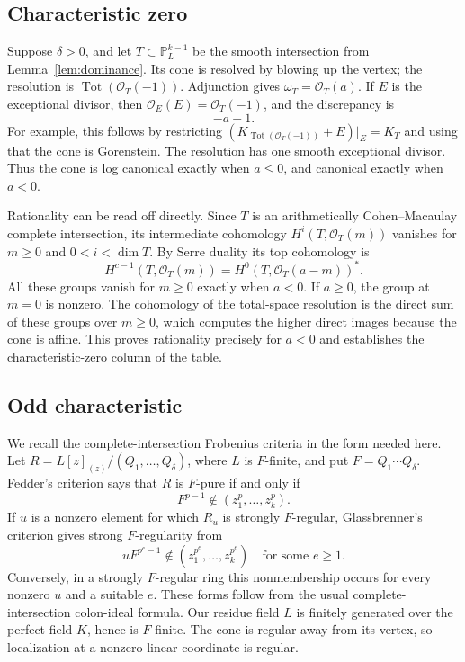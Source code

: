 \documentclass[11pt]{article}
\theoremstyle{definition}
\theoremstyle{remark}
\numberwithin{equation}{section}
\DeclareMathOperator{\Tot}{Tot}
\newcommand{\PP}{\mathbb P}
\newcommand{\OO}{\mathcal O}
\begin{document}
\subsection{Characteristic zero}

Suppose $\delta>0$, and let $T\subset\PP^{k-1}_L$ be the smooth
intersection from Lemma~\ref{lem:dominance}. Its cone is resolved by
blowing up the vertex; the resolution is $\Tot(\OO_T(-1))$.
Adjunction gives $\omega_T=\OO_T(a)$. If $E$ is the exceptional
divisor, then $\OO_E(E)=\OO_T(-1)$, and the discrepancy is
\begin{equation}\label{eq:discrepancy}
 -a-1.
\end{equation}
For example, this follows by restricting
$(K_{\Tot(\OO_T(-1))}+E)|_E=K_T$ and using that the cone is
Gorenstein. The resolution has one smooth exceptional divisor.
Thus the cone is log canonical exactly when $a\leq0$, and canonical
exactly when $a<0$.

Rationality can be read off directly. Since $T$ is an arithmetically
Cohen--Macaulay complete intersection, its intermediate cohomology
$H^i(T,\OO_T(m))$ vanishes for $m\geq0$ and
$0<i<\dim T$. By Serre duality its top cohomology is
\[
 H^{c-1}(T,\OO_T(m))
   =H^0(T,\OO_T(a-m))^*.
\]
All these groups vanish for $m\geq0$ exactly when $a<0$. If
$a\geq0$, the group at $m=0$ is nonzero. The cohomology of the
total-space resolution is the direct sum of these groups over
$m\geq0$, which computes the higher direct images because the
cone is affine. This proves rationality precisely for $a<0$ and
establishes the characteristic-zero column of the table.

\subsection{Odd characteristic}

We recall the complete-intersection Frobenius criteria in the form
needed here. Let
$R=L[z]_{(z)}/(Q_1,\ldots,Q_\delta)$, where $L$ is $F$-finite,
and put $F=Q_1\cdots Q_\delta$. Fedder's criterion \cite{Fedder}
says that $R$ is $F$-pure if and only if
\begin{equation}\label{eq:Fedder}
 F^{p-1}\notin(z_1^p,\ldots,z_k^p).
\end{equation}
If $u$ is a nonzero element for which $R_u$ is strongly $F$-regular,
Glassbrenner's criterion \cite[Theorem 4.1]{Glassbrenner} gives strong
$F$-regularity from
\begin{equation}\label{eq:Glassbrenner}
 uF^{p^e-1}\notin(z_1^{p^e},\ldots,z_k^{p^e})
 \quad\text{for some }e\geq1.
\end{equation}
Conversely, in a strongly $F$-regular ring this nonmembership occurs
for every nonzero $u$ and a suitable $e$. These forms follow from
the usual complete-intersection colon-ideal formula. Our residue
field $L$ is finitely generated over the perfect field $K$, hence
is $F$-finite. The cone is regular away from its vertex, so
localization at a nonzero linear coordinate is regular.
\end{document}
